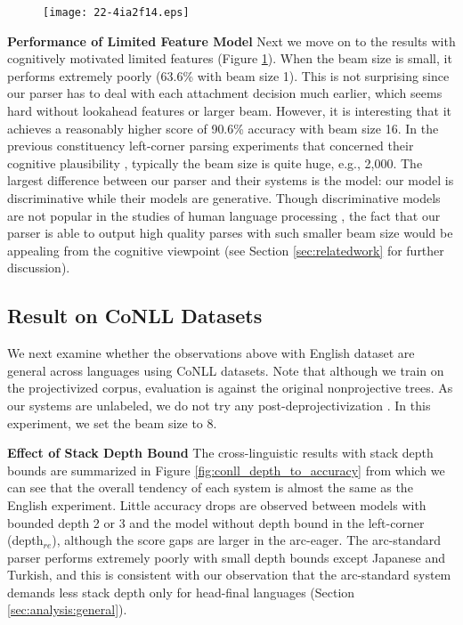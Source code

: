 \documentclass[english]{jnlp_1.4}
\begin{document}
\begin{figure}[b]
\begin{center}
\texttt{[image: 22-4ia2f14.eps]}
\end{center}
\label{fig:plot}
\end{figure}

    \noindent\textbf{Performance of Limited Feature Model}
Next we move on to the results with cognitively motivated limited features (Figure \ref{fig:plot}).
When the beam size is small, it performs extremely poorly (63.6\% with beam size 1).
This is not surprising since our parser has to deal with each attachment decision much earlier, which seems hard without lookahead features or larger beam.
However, it is interesting that it achieves a reasonably higher score of 90.6\% accuracy with beam size 16.
In the previous constituency left-corner parsing experiments that concerned their cognitive plausibility \cite{journals/coling/SchulerAMS10,TOPS:TOPS12034}, typically the beam size is quite huge, e.g., 2,000.
The largest difference between our parser and their systems is the model: our model is discriminative while their models are generative.
Though discriminative models are not popular in the studies of human language processing \cite{keller:2010:Short}, the fact that our parser is able to output high quality parses with such smaller beam size would be appealing from the cognitive viewpoint (see Section \ref{sec:relatedwork} for further discussion).


\subsection{Result on CoNLL Datasets}

We next examine whether the observations above with English dataset are general across languages using CoNLL datasets.
Note that although we train on the projectivized corpus, evaluation is against the original nonprojective trees.
As our systems are unlabeled, we do not try any post-deprojectivization \cite{nivre-nilsson:2005:ACL}.
In this experiment, we set the beam size to 8.

    \noindent\textbf{Effect of Stack Depth Bound}
The cross-linguistic results with stack depth bounds are summarized in Figure \ref{fig:conll_depth_to_accuracy} from which we can see that the overall tendency of each system is almost the same as the English experiment.
Little accuracy drops are observed between models with bounded depth 2 or 3 and the model without depth bound in the left-corner (depth$_{re}$), although the score gaps are larger in the arc-eager.
The arc-standard parser performs extremely poorly with small depth bounds except Japanese and Turkish, and this is consistent with our observation that the arc-standard system demands less stack depth only for head-final languages (Section \ref{sec:analysis:general}).
\end{document}
